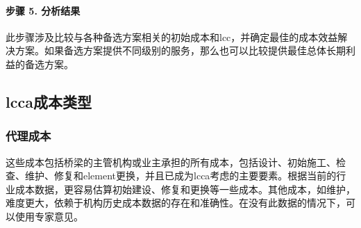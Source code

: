 \paragraph*{步骤 5. 分析结果}
此步骤涉及比较与各种备选方案相关的初始成本和\acrlong*{lcc}，并确定最佳的成本效益解决方案。如果备选方案提供不同级别的服务，那么也可以比较提供最佳总体长期利益的备选方案。

\subsection{\texorpdfstring{\acrlong*{lcca}}{全生命周期成本分析}成本类型}
\label{subsec:lcca-cost-types}
\subsubsection{代理成本}
这些成本包括桥梁的主管机构或业主承担的所有成本，包括设计、初始施工、检查、维护、修复和\gls*{element}更换，并且已成为\acrlong*{lcca}考虑的主要要素。根据当前的行业成本数据，更容易估算初始建设、修复和更换等一些成本。其他成本，如维护，难度更大，依赖于机构历史成本数据的存在和准确性。在没有此数据的情况下，可以使用专家意见。

